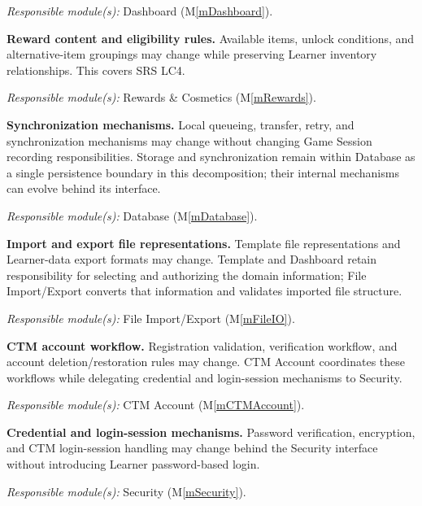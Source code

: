 \documentclass[12pt, titlepage]{article}
\newcounter{acnum}
\newcommand{\actheacnum}{AC\theacnum}
\newcommand{\mref}[1]{M\ref{#1}}
\begin{document}
\begin{description}
\textit{Responsible module(s):} Dashboard (\mref{mDashboard}).

\item[\refstepcounter{acnum} \actheacnum
\label{acRewards}:]
\textbf{Reward content and eligibility rules.}
Available items, unlock conditions, and alternative-item groupings may change while preserving Learner inventory relationships. This covers SRS LC4.

\textit{Responsible module(s):} Rewards \& Cosmetics (\mref{mRewards}).

\item[\refstepcounter{acnum} \actheacnum
\label{acDataExchange}:]
\textbf{Synchronization mechanisms.}
Local queueing, transfer, retry, and synchronization mechanisms may change without changing Game Session recording responsibilities. Storage and synchronization remain within Database as a single persistence boundary in this decomposition; their internal mechanisms can evolve behind its interface.

\textit{Responsible module(s):} Database (\mref{mDatabase}).

\item[\refstepcounter{acnum} \actheacnum
\label{acExportFormat}:]
\textbf{Import and export file representations.}
Template file representations and Learner-data export formats may change. Template and Dashboard retain responsibility for selecting and authorizing the domain information; File Import/Export converts that information and validates imported file structure.

\textit{Responsible module(s):} File Import/Export (\mref{mFileIO}).

\item[\refstepcounter{acnum} \actheacnum
\label{acAccountWorkflow}:]
\textbf{CTM account workflow.}
Registration validation, verification workflow, and account deletion/restoration rules may change. CTM Account coordinates these workflows while delegating credential and login-session mechanisms to Security.

\textit{Responsible module(s):} CTM Account (\mref{mCTMAccount}).

\item[\refstepcounter{acnum} \actheacnum
\label{acAuthentication}:]
\textbf{Credential and login-session mechanisms.}
Password verification, encryption, and CTM login-session handling may change behind the Security interface without introducing Learner password-based login.

\textit{Responsible module(s):} Security (\mref{mSecurity}).


\end{description}
\end{document}
